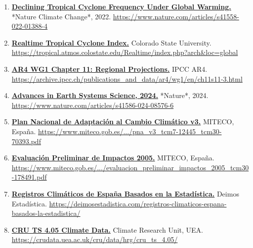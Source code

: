 \documentclass[
  10pt,
  a4paper,
  DIV=11,
  numbers=noendperiod,
  open=any]{scrreprt}
\numberwithin{equation}{chapter}
\numberwithin{equation}{section}
\renewcommand{\[}{\begin{equation}}
\renewcommand{\]}{\end{equation}}
\begin{document}
\begin{enumerate}
  \item \label{ref:web8}\href{https://www.nature.com/articles/s41558-022-01388-4}{\textbf{Declining Tropical Cyclone Frequency Under Global Warming.}} *Nature Climate Change*, 2022.  
  \url{https://www.nature.com/articles/s41558-022-01388-4}

  \item \label{ref:web9}\href{https://tropical.atmos.colostate.edu/Realtime/index.php?arch\&loc=global}{\textbf{Realtime Tropical Cyclone Index.}} Colorado State University.  
  \url{https://tropical.atmos.colostate.edu/Realtime/index.php?arch&loc=global}

  \item \label{ref:web10}\href{https://archive.ipcc.ch/publications_and_data/ar4/wg1/en/ch11s11-3.html}{\textbf{AR4 WG1 Chapter 11: Regional Projections.}} IPCC AR4.  
  \url{https://archive.ipcc.ch/publications_and_data/ar4/wg1/en/ch11s11-3.html}

  \item \label{ref:web11}\href{https://www.nature.com/articles/s41586-024-08576-6}{\textbf{Advances in Earth Systems Science, 2024.}} *Nature*, 2024.  
  \url{https://www.nature.com/articles/s41586-024-08576-6}

  \item \label{ref:web12}\href{https://www.miteco.gob.es/content/dam/miteco/es/cambio-climatico/temas/impactos-vulnerabilidad-y-adaptacion/pna_v3_tcm7-12445_tcm30-70393.pdf}{\textbf{Plan Nacional de Adaptación al Cambio Climático v3.}} MITECO, España.  
  \url{https://www.miteco.gob.es/.../pna_v3_tcm7-12445_tcm30-70393.pdf}

  \item \label{ref:web13}\href{https://www.miteco.gob.es/content/dam/miteco/es/cambio-climatico/temas/impactos-vulnerabilidad-y-adaptacion/evaluacion_preliminar_impactos_2005_tcm30-178491.pdf}{\textbf{Evaluación Preliminar de Impactos 2005.}} MITECO, España.  
  \url{https://www.miteco.gob.es/.../evaluacion_preliminar_impactos_2005_tcm30-178491.pdf}

  \item \label{ref:web14}\href{https://deimosestadistica.com/registros-climaticos-espana-basados-la-estadistica/}{\textbf{Registros Climáticos de España Basados en la Estadística.}} Deimos Estadística.  
  \url{https://deimosestadistica.com/registros-climaticos-espana-basados-la-estadistica/}

  \item \label{ref:web15}\href{https://crudata.uea.ac.uk/cru/data/hrg/cru_ts_4.05/}{\textbf{CRU TS 4.05 Climate Data.}} Climate Research Unit, UEA.  
  \url{https://crudata.uea.ac.uk/cru/data/hrg/cru_ts_4.05/}


\end{enumerate}
\end{document}
